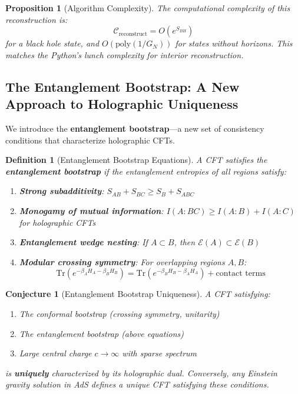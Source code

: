 \documentclass[12pt,a4paper]{article}
\newtheorem{conjecture}[theorem]{Conjecture}
\newtheorem{definition}[theorem]{Definition}
\newtheorem{proposition}[theorem]{Proposition}
\begin{document}
\begin{proposition}[Algorithm Complexity]
The computational complexity of this reconstruction is:
\begin{equation}
\mathcal{C}_{\text{reconstruct}} = O\left( e^{S_{BH}} \right)
\end{equation}
for a black hole state, and $O(\text{poly}(1/G_N))$ for states without horizons. This matches the Python's lunch complexity for interior reconstruction.
\end{proposition}

\subsection{The Entanglement Bootstrap: A New Approach to Holographic Uniqueness}

We introduce the \textbf{entanglement bootstrap}---a new set of consistency conditions that characterize holographic CFTs.

\begin{definition}[Entanglement Bootstrap Equations]
A CFT satisfies the \textbf{entanglement bootstrap} if the entanglement entropies of all regions satisfy:
\begin{enumerate}
    \item \textbf{Strong subadditivity}: $S_{AB} + S_{BC} \geq S_B + S_{ABC}$
    \item \textbf{Monogamy of mutual information}: $I(A:BC) \geq I(A:B) + I(A:C)$ for holographic CFTs
    \item \textbf{Entanglement wedge nesting}: If $A \subset B$, then $\mathcal{E}(A) \subset \mathcal{E}(B)$
    \item \textbf{Modular crossing symmetry}: For overlapping regions $A, B$:
    \begin{equation}
    \text{Tr}\left( e^{-\beta_A H_A - \beta_B H_B} \right) = \text{Tr}\left( e^{-\beta_B H_B - \beta_A H_A} \right) + \text{contact terms}
    \end{equation}
\end{enumerate}
\end{definition}

\begin{conjecture}[Entanglement Bootstrap Uniqueness]
A CFT satisfying:
\begin{enumerate}
    \item The conformal bootstrap (crossing symmetry, unitarity)
    \item The entanglement bootstrap (above equations)
    \item Large central charge $c \to \infty$ with sparse spectrum
\end{enumerate}
is \textbf{uniquely} characterized by its holographic dual. Conversely, any Einstein gravity solution in AdS defines a unique CFT satisfying these conditions.
\end{conjecture}
\end{document}
